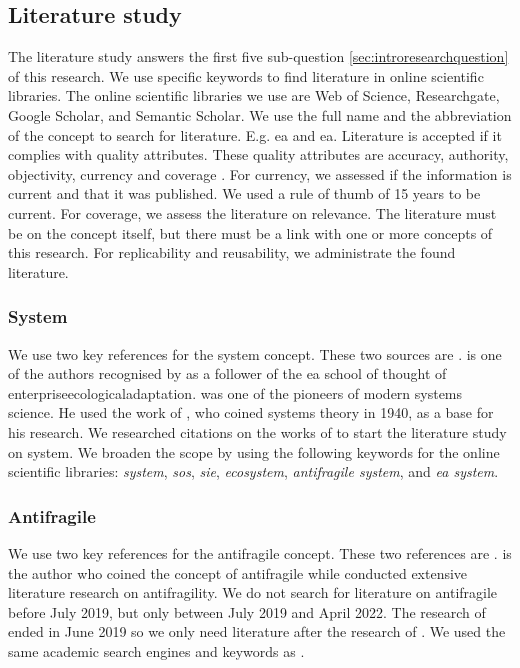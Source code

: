 \subsection{Literature study}
\label{sub:literaturestudy}
The literature study answers the first five sub-question \cref{sec:introresearchquestion} of this research. We use specific keywords to find literature in online scientific libraries. The online scientific libraries we use are Web of Science, Researchgate, Google Scholar, and Semantic Scholar. We use the full name and the abbreviation of the concept to search for literature. E.g. \gls{ea} and \acrshort{ea}. Literature is accepted if it complies with quality \glspl{attribute}. These quality \glspl{attribute} are accuracy, authority, objectivity, currency and coverage \parencite{CityUniHongKong2021}. For currency, we assessed if the information is current and that it was published. We used a rule of thumb of 15 years to be current. For coverage, we assess the literature on relevance. The literature must be on the concept itself, but there must be a link with one or more concepts of this research. For replicability and reusability, we administrate the found literature.

\subsubsection{System}
\label{subsub:system}
We use two key references for the system concept. These two sources are \textcites{Ackoff1973}{Gharajedaghi2011}. \textcite{Gharajedaghi2011} is one of the authors recognised by \textcite{Lapalme2012} as a follower of the \gls{ea} school of thought of \gls{enterpriseecologicaladaptation}. \textcite{Ackoff1973} was one of the pioneers of modern systems science. He used the work of  \textcite{Bertalanffy1968}, who coined systems theory in 1940, as a base for his research. We researched citations on the works of \textcites{Ackoff1973}{Gharajedaghi2011} to start the literature study on system. We broaden the scope by using the following keywords for the online scientific libraries: \textit{system}, \textit{\gls{sos}}, \textit{\gls{sie}}, \textit{ecosystem}, \textit{\gls{antifragile} system}, and \textit{\gls{ea} system}.

\subsubsection{Antifragile}
\label{subsub:antifragile}
We use two key references for the \gls{antifragile} concept. These two references are \textcites{Taleb2012}{Botjes2021}. \textcite{Taleb2012} is the author who coined the concept of \gls{antifragile} while \textcite{Botjes2021} conducted extensive literature research on \gls{antifragility}. We do not search for literature on \gls{antifragile} before July 2019, but only between July 2019 and April 2022. The research of \textcite{Botjes2021} ended in June 2019 so we only need literature after the research of \textcite{Botjes2021}. We used the same academic search engines and keywords as \textcite[p.~5]{Botjes2021}.

